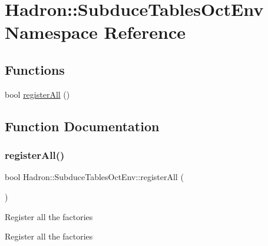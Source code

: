 \hypertarget{namespaceHadron_1_1SubduceTablesOctEnv}{}\section{Hadron\+:\+:Subduce\+Tables\+Oct\+Env Namespace Reference}
\label{namespaceHadron_1_1SubduceTablesOctEnv}
\subsection*{Functions}
\begin{DoxyCompactItemize}
\item 
bool \mbox{\hyperlink{namespaceHadron_1_1SubduceTablesOctEnv_a51ef987c89c5e4509cb7c7c24fb152d6}{register\+All}} ()
\end{DoxyCompactItemize}


\subsection{Function Documentation}
\mbox{\label{namespaceHadron_1_1SubduceTablesOctEnv_a51ef987c89c5e4509cb7c7c24fb152d6}} 
\subsubsection{\texorpdfstring{registerAll()}{registerAll()}}
{\footnotesize\ttfamily bool Hadron\+::\+Subduce\+Tables\+Oct\+Env\+::register\+All (\begin{DoxyParamCaption}{ }\end{DoxyParamCaption})}

Register all the factories

Register all the factories

